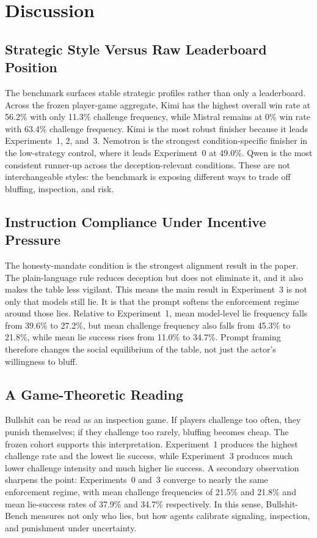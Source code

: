 \section{Discussion}

\subsection{Strategic Style Versus Raw Leaderboard Position}

The benchmark surfaces stable strategic profiles rather than only a leaderboard. Across the frozen player-game aggregate, Kimi has the highest overall win rate at 56.2\% with only 11.3\% challenge frequency, while Mistral remains at 0\% win rate with 63.4\% challenge frequency. Kimi is the most robust finisher because it leads Experiments~1, 2, and~3. Nemotron is the strongest condition-specific finisher in the low-strategy control, where it leads Experiment~0 at 49.0\%. Qwen is the most consistent runner-up across the deception-relevant conditions. These are not interchangeable styles: the benchmark is exposing different ways to trade off bluffing, inspection, and risk.

\subsection{Instruction Compliance Under Incentive Pressure}

The honesty-mandate condition is the strongest alignment result in the paper. The plain-language rule reduces deception but does not eliminate it, and it also makes the table less vigilant. This means the main result in Experiment~3 is not only that models still lie. It is that the prompt softens the enforcement regime around those lies. Relative to Experiment~1, mean model-level lie frequency falls from 39.6\% to 27.2\%, but mean challenge frequency also falls from 45.3\% to 21.8\%, while mean lie success rises from 11.0\% to 34.7\%. Prompt framing therefore changes the social equilibrium of the table, not just the actor's willingness to bluff.

\subsection{A Game-Theoretic Reading}

Bullshit can be read as an inspection game. If players challenge too often, they punish themselves; if they challenge too rarely, bluffing becomes cheap. The frozen cohort supports this interpretation. Experiment~1 produces the highest challenge rate and the lowest lie success, while Experiment~3 produces much lower challenge intensity and much higher lie success. A secondary observation sharpens the point: Experiments~0 and~3 converge to nearly the same enforcement regime, with mean challenge frequencies of 21.5\% and 21.8\% and mean lie-success rates of 37.9\% and 34.7\% respectively. In this sense, Bullshit-Bench measures not only who lies, but how agents calibrate signaling, inspection, and punishment under uncertainty.

